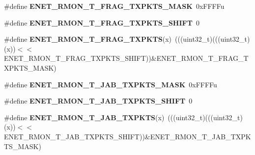 \begin{DoxyCompactItemize}
\item 
\#define {\bfseries E\+N\+E\+T\+\_\+\+R\+M\+O\+N\+\_\+\+T\+\_\+\+F\+R\+A\+G\+\_\+\+T\+X\+P\+K\+T\+S\+\_\+\+M\+A\+SK}~0x\+F\+F\+F\+Fu\hypertarget{group__ENET__Register__Masks_ga165675b1bc4ead102b209af312a64e30}{}\label{group__ENET__Register__Masks_ga165675b1bc4ead102b209af312a64e30}

\item 
\#define {\bfseries E\+N\+E\+T\+\_\+\+R\+M\+O\+N\+\_\+\+T\+\_\+\+F\+R\+A\+G\+\_\+\+T\+X\+P\+K\+T\+S\+\_\+\+S\+H\+I\+FT}~0\hypertarget{group__ENET__Register__Masks_gaaab8a0b71f5d34f28a4fc9c1cefd6c21}{}\label{group__ENET__Register__Masks_gaaab8a0b71f5d34f28a4fc9c1cefd6c21}

\item 
\#define {\bfseries E\+N\+E\+T\+\_\+\+R\+M\+O\+N\+\_\+\+T\+\_\+\+F\+R\+A\+G\+\_\+\+T\+X\+P\+K\+TS}(x)~(((uint32\+\_\+t)(((uint32\+\_\+t)(x))$<$$<$E\+N\+E\+T\+\_\+\+R\+M\+O\+N\+\_\+\+T\+\_\+\+F\+R\+A\+G\+\_\+\+T\+X\+P\+K\+T\+S\+\_\+\+S\+H\+I\+FT))\&E\+N\+E\+T\+\_\+\+R\+M\+O\+N\+\_\+\+T\+\_\+\+F\+R\+A\+G\+\_\+\+T\+X\+P\+K\+T\+S\+\_\+\+M\+A\+SK)\hypertarget{group__ENET__Register__Masks_ga010507349cf682b907697293a4302774}{}\label{group__ENET__Register__Masks_ga010507349cf682b907697293a4302774}

\item 
\#define {\bfseries E\+N\+E\+T\+\_\+\+R\+M\+O\+N\+\_\+\+T\+\_\+\+J\+A\+B\+\_\+\+T\+X\+P\+K\+T\+S\+\_\+\+M\+A\+SK}~0x\+F\+F\+F\+Fu\hypertarget{group__ENET__Register__Masks_ga94c366b90093533c7f2149d62fa72133}{}\label{group__ENET__Register__Masks_ga94c366b90093533c7f2149d62fa72133}

\item 
\#define {\bfseries E\+N\+E\+T\+\_\+\+R\+M\+O\+N\+\_\+\+T\+\_\+\+J\+A\+B\+\_\+\+T\+X\+P\+K\+T\+S\+\_\+\+S\+H\+I\+FT}~0\hypertarget{group__ENET__Register__Masks_gac8ba73230f05449d87137e0a0c32d72a}{}\label{group__ENET__Register__Masks_gac8ba73230f05449d87137e0a0c32d72a}

\item 
\#define {\bfseries E\+N\+E\+T\+\_\+\+R\+M\+O\+N\+\_\+\+T\+\_\+\+J\+A\+B\+\_\+\+T\+X\+P\+K\+TS}(x)~(((uint32\+\_\+t)(((uint32\+\_\+t)(x))$<$$<$E\+N\+E\+T\+\_\+\+R\+M\+O\+N\+\_\+\+T\+\_\+\+J\+A\+B\+\_\+\+T\+X\+P\+K\+T\+S\+\_\+\+S\+H\+I\+FT))\&E\+N\+E\+T\+\_\+\+R\+M\+O\+N\+\_\+\+T\+\_\+\+J\+A\+B\+\_\+\+T\+X\+P\+K\+T\+S\+\_\+\+M\+A\+SK)\hypertarget{group__ENET__Register__Masks_ga708fa1bfbc3cf03da5b4beb7a24b8e67}{}\label{group__ENET__Register__Masks_ga708fa1bfbc3cf03da5b4beb7a24b8e67}


\end{DoxyCompactItemize}
